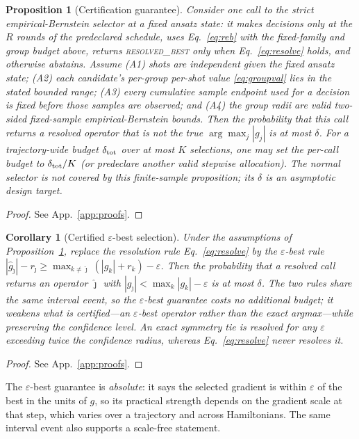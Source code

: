 \documentclass[aps,pra,reprint,superscriptaddress,nofootinbib,floatfix]{revtex4-2}
\newtheorem{proposition}{Proposition}
\newtheorem{corollary}{Corollary}
\begin{document}
\begin{proposition}[Certification guarantee]
\label{prop:cert}
Consider one call to the \emph{strict empirical-Bernstein selector} at a fixed ansatz state: it makes decisions only at the $R$ rounds of the predeclared schedule, uses Eq.~\eqref{eq:reb} with the fixed-family and group budget above, returns \textsc{resolved\_best} only when Eq.~\eqref{eq:resolve} holds, and otherwise abstains. Assume (A1) shots are independent given the fixed ansatz state; (A2) each candidate's per-group per-shot value \eqref{eq:groupval} lies in the stated bounded range; (A3) every cumulative sample endpoint used for a decision is fixed before those samples are observed; and (A4) the group radii are valid two-sided fixed-sample empirical-Bernstein bounds. Then the probability that this call returns a resolved operator that is not the true $\arg\max_j|g_j|$ is at most $\delta$. For a trajectory-wide budget $\delta_{\rm tot}$ over at most $K$ selections, one may set the per-call budget to $\delta_{\rm tot}/K$ (or predeclare another valid stepwise allocation). The normal selector is not covered by this finite-sample proposition; its $\delta$ is an asymptotic design target.
\end{proposition}
\begin{proof}
See App.~\ref{app:proofs}.
\end{proof}

\begin{corollary}[Certified $\varepsilon$-best selection]
\label{cor:epsbest}
Under the assumptions of Proposition~\ref{prop:cert}, replace the resolution rule Eq.~\eqref{eq:resolve} by the $\varepsilon$-best rule $|\widehat g_{\hat\jmath}|-r_{\hat\jmath}\ge\max_{k\neq\hat\jmath}(|\widehat g_k|+r_k)-\varepsilon$. Then the probability that a resolved call returns an operator $\hat\jmath$ with $|g_{\hat\jmath}|<\max_k|g_k|-\varepsilon$ is at most $\delta$. The two rules share the same interval event, so the $\varepsilon$-best guarantee costs no additional budget; it weakens \emph{what} is certified---an $\varepsilon$-best operator rather than the exact argmax---while preserving the confidence level. An exact symmetry tie is resolved for any $\varepsilon$ exceeding twice the confidence radius, whereas Eq.~\eqref{eq:resolve} never resolves it.
\end{corollary}
\begin{proof}
See App.~\ref{app:proofs}.
\end{proof}

The $\varepsilon$-best guarantee is \emph{absolute}: it says the selected gradient is within $\varepsilon$ of the best in the units of $g$, so its practical strength depends on the gradient scale at that step, which varies over a trajectory and across Hamiltonians. The same interval event also supports a scale-free statement.
\end{document}
